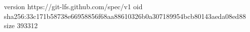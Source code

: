 version https://git-lfs.github.com/spec/v1
oid sha256:33c171b58738e66958856f68aa88610326b0a307189954bcb80143aeda08ed88
size 393312
